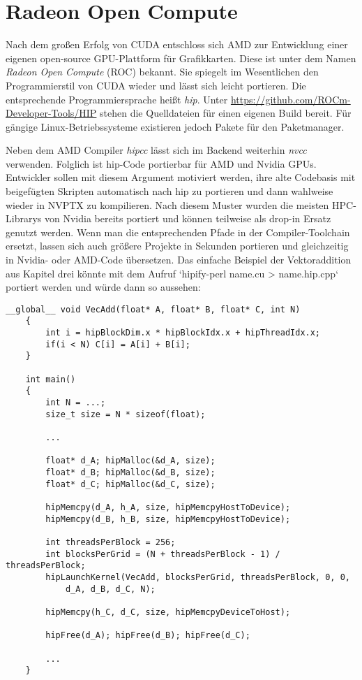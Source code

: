 	\chapter{Radeon Open Compute}
	Nach dem großen Erfolg von CUDA entschloss sich AMD zur Entwicklung einer eigenen open-source GPU-Plattform für Grafikkarten. Diese ist unter dem Namen \textit{Radeon Open Compute} (ROC) bekannt. Sie spiegelt im Wesentlichen den Programmierstil von CUDA wieder und lässt sich leicht portieren. Die entsprechende Programmiersprache heißt \textit{hip}. Unter \url{https://github.com/ROCm-Developer-Tools/HIP} stehen die Quelldateien für einen eigenen Build bereit. Für gängige Linux-Betriebssysteme existieren jedoch Pakete für den Paketmanager.
	
	Neben dem AMD Compiler \textit{hipcc} lässt sich im Backend weiterhin \textit{nvcc} verwenden. Folglich ist hip-Code portierbar für AMD und Nvidia GPUs. Entwickler sollen mit diesem Argument motiviert werden, ihre alte Codebasis mit beigefügten Skripten automatisch nach hip zu portieren und dann wahlweise wieder in \Gls{NVPTX} zu kompilieren. Nach diesem Muster wurden die meisten HPC-Librarys von Nvidia bereits portiert und können teilweise als drop-in Ersatz genutzt werden. Wenn man die entsprechenden Pfade in der Compiler-Toolchain ersetzt, lassen sich auch größere Projekte in Sekunden portieren und gleichzeitig in Nvidia- oder AMD-Code übersetzen. Das einfache Beispiel der Vektoraddition aus Kapitel drei könnte mit dem Aufruf \li`hipify-perl name.cu > name.hip.cpp` portiert werden und würde dann so aussehen:
	
	\begin{lstlisting}[caption=Radeon Open Compute]
	__global__ void VecAdd(float* A, float* B, float* C, int N)
	{
    	int i = hipBlockDim.x * hipBlockIdx.x + hipThreadIdx.x;
	    if(i < N) C[i] = A[i] + B[i];
	}
            
	int main()
	{
    	int N = ...;
	    size_t size = N * sizeof(float);
		
		...
		
	    float* d_A; hipMalloc(&d_A, size);
    	float* d_B; hipMalloc(&d_B, size);
	    float* d_C; hipMalloc(&d_C, size);

	    hipMemcpy(d_A, h_A, size, hipMemcpyHostToDevice);
    	hipMemcpy(d_B, h_B, size, hipMemcpyHostToDevice);

    	int threadsPerBlock = 256;
    	int blocksPerGrid = (N + threadsPerBlock - 1) / threadsPerBlock;
    	hipLaunchKernel(VecAdd, blocksPerGrid, threadsPerBlock, 0, 0, 
    		d_A, d_B, d_C, N);

    	hipMemcpy(h_C, d_C, size, hipMemcpyDeviceToHost);
   
    	hipFree(d_A); hipFree(d_B); hipFree(d_C);

		...
	}
	\end{lstlisting}
	
